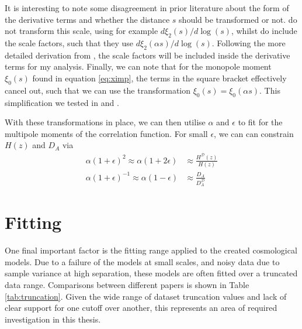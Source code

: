 \documentclass[titlesmallcaps, examinerscopy, copyrightpage]{uqthesis}
\begin{document}
It is interesting to note some disagreement in prior literature about the form of the derivative terms and whether the distance $s$ should be transformed or not. \citet{KazinSanchezBlanton2012} do not transform this scale, using for example $d\xi_2(s)/d\log(s)$, whilst \citet{XuCuesta2013} do include the scale factors, such that they use $d\xi_2(\alpha s) / d\log(s)$. Following the more detailed derivation from \citet{XuCuesta2013}, the scale factors will be included inside the derivative terms for my analysis. Finally, we can note that for the monopole moment $\xi_0(s)$ found in equation \eqref{eq:ximp}, the terms in the square bracket effectively cancel out, such that we can use the transformation $\xi_0(s) = \xi_0(\alpha s)$. This simplification we tested in \citet{Sanchez2009} and \citet{EisensteinZehavi2005}.

With these transformations in place, we can then utilise $\alpha$ and $\epsilon$ to fit for the multipole moments of the correlation function. For small $\epsilon$, we can can constrain $H(z)$ and $D_A$ via
\begin{align}
\alpha(1 + \epsilon)^2 \approx \alpha(1 + 2\epsilon) &\approx \frac{H^\mathcal{D}(z)}{H(z)} \\
\alpha(1 + \epsilon)^{-1} \approx \alpha(1 - \epsilon) &\approx \frac{D_A}{D_A^\mathcal{D}}
\end{align}



\newpage
\section{Fitting} \label{sec:trunc}

One final important factor is the fitting range applied to the created cosmological models. Due to a failure of the models at small scales, and noisy data due to sample variance at high separation, these models are often fitted over a truncated data range. Comparisons between different papers is shown in Table \ref{tab:truncation}. Given the wide range of dataset truncation values and lack of clear support for one cutoff over another, this represents an area of required investigation in this thesis.
\end{document}
